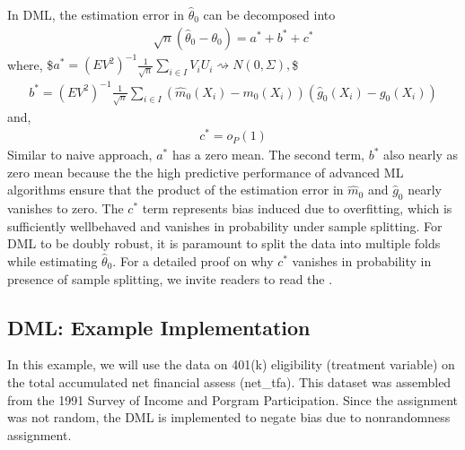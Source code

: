 \documentclass[letterpaper,10pt,english]{jupyterBook}
\begin{document}
\sphinxAtStartPar
In DML, the estimation error in \(\hat\theta_0\) can be decomposed into
\begin{equation*}
\begin{split}\sqrt{n}(\hat\theta_0-\theta_0) = a^* + b^* + c^*\end{split}
\end{equation*}
\sphinxAtStartPar
where,
\$\(a^* = (EV^2)^{-1}\frac{1}{\sqrt{n}}\sum_{i \in I}V_iU_i \rightsquigarrow N(0, \Sigma),\)\$
\begin{equation*}
\begin{split}b^* = (EV^2)^{-1}\frac{1}{\sqrt{n}}\sum_{i \in I}(\hat m_0(X_i) - m_0(X_i))(\hat g_0(X_i) - g_0(X_i)) \end{split}
\end{equation*}
\sphinxAtStartPar
and,
\begin{equation*}
\begin{split} c^*  = o_P(1)\end{split}
\end{equation*}
\sphinxAtStartPar
Similar to naive approach, \(a^*\) has a zero mean. The second term, \(b^*\) also nearly as zero mean because the the high predictive performance of advanced ML algorithms ensure that the product of the estimation error in \(\hat m_0\) and \(\hat g_0\) nearly vanishes to zero. The \(c^*\) term represents bias induced due to overfitting, which is sufficiently well\sphinxhyphen{}behaved and vanishes in probability under sample splitting. For DML to be doubly robust, it is paramount to split the data into multiple folds while estimating \(\hat\theta_0\). For a detailed proof on why \(c^*\) vanishes in probability in presence of sample splitting, we invite readers to read the .


\subsection{DML: Example Implementation}
\label{\detokenize{orthogonal_DML:dml-example-implementation}}
\sphinxAtStartPar
In this example, we will use the data on 401(k) eligibility (treatment variable) on the total accumulated net financial assess (net\_tfa). This dataset was assembled from the 1991 Survey of Income and Porgram Participation. Since the assignment was not random, the DML is implemented to negate bias due to non\sphinxhyphen{}randomness assignment.
\end{document}
